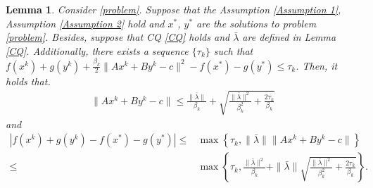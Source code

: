 \documentclass{article}
\numberwithin{equation}{section}
\newtheorem{lemma}{Lemma}[section]
\begin{document}
\begin{lemma} \label{lemma_Ax+By-c}
    Consider \eqref{problem}. Suppose that the Assumption \ref{Assumption 1}, Assumption \ref{Assumption 2} 
    hold and  $x^*$, $y^*$ are the solutions to problem \eqref{problem}. Besides, suppose that 
    CQ \eqref{CQ} holds and $\bar{\lambda}$ are defined in Lemma \ref{CQ}. Additionally,  
    there exists a sequence $\{\tau_k\}$ such that $f(x^k)+ g(y^k)+\frac{\beta_k}{2}\|Ax^k+By^k-c\rVert^2 -f(x^*)-g(y^*)\leq \tau_k$. 
    Then, it holds that.  
    \begin{align}
        \|Ax^k+By^k-c\rVert \leq \frac{\|\bar{\lambda}\rVert}{\beta_k} + \sqrt{\frac{\|\bar{\lambda}\rVert^2}{\beta_k^2}+\frac{2\tau_k}{\beta_k}}
        \nonumber
    \end{align}
    and
    \begin{align}
        \left|f(x^k)+ g(y^k) -f(x^*)-g(y^*) \right| \leq & 
        \max\left\{ \tau_k, \|\bar{\lambda}\rVert\|Ax^k+ By^k-c\rVert \right\} \nonumber \\
        \leq & \max\left\{ \tau_k, \frac{\|\bar{\lambda}\rVert^2}{\beta_k} + \|\bar{\lambda}\rVert\sqrt{\frac{\|\bar{\lambda}\rVert^2}{\beta_k^2}+\frac{2\tau_k}{\beta_k}} \right\}. 
        \nonumber
    \end{align} 
\end{lemma}
\end{document}
